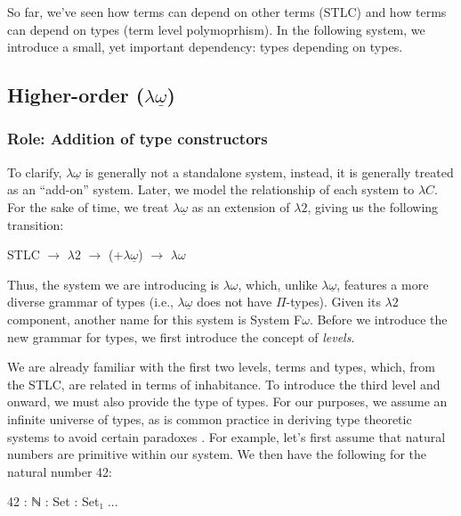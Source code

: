 \documentclass[12pt]{article}
\begin{document}
So far, we've seen how terms can depend on other terms (STLC) and how terms can
depend on types (term level polymoprhism). In the following system, we introduce
a small, yet important dependency: types depending on types.

\subsection*{Higher-order (\(\lambda\underline{\omega}\))}
\subsubsection*{Role: Addition of type constructors}

To clarify, \(\lambda\underline{\omega}\) is generally not a standalone system,
instead, it is generally treated as an ``add-on'' system. Later, we model the
relationship of each system to \(\lambda C\). For the sake of time, we treat
\(\lambda\underline{\omega}\) as an extension of \(\lambda2\), giving us the
following transition:

\begin{center}
\begin{minipage}{0.4\textwidth}
STLC \(\rightarrow\) \(\lambda2\) \(\rightarrow\) (+\(\lambda\underline{\omega}\)) \(\rightarrow\) \(\lambda\omega\)
\end{minipage}
\end{center}

Thus, the system we are introducing is \(\lambda\omega\), which, unlike
\(\lambda\underline{\omega}\), features a more diverse grammar of types (i.e.,
\(\lambda\underline{\omega}\) does not have \(\Pi\)-types). Given its \(\lambda2\)
component, another name for this system is System F\(\omega\). Before we introduce
the new grammar for types, we first introduce the concept of {\em levels}.

We are already familiar with the first two levels, terms and types, which, from
the STLC, are related in terms of inhabitance. To introduce the third level and
onward, we must also provide the type of types. For our purposes, we assume an
infinite universe of types, as is common practice in deriving type theoretic
systems to avoid certain paradoxes \cite{}. For example, let's first assume that
natural numbers are primitive within our system. We then have the following for
the natural number 42:

\begin{center}
\begin{minipage}{0.4\textwidth}
\begin{code}
42 : ℕ : Set : Set₁ ...
\end{code}
\end{minipage}
\end{center}
\end{document}
